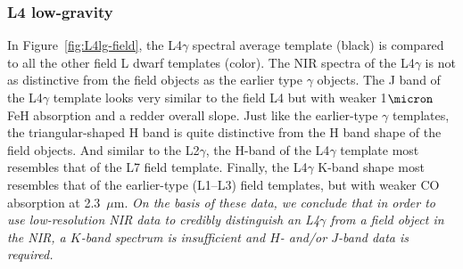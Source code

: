 \documentclass[12pt,preprint]{aastex}
\begin{document}
\subsubsection{L4 low-gravity}
In Figure~\ref{fig:L4lg-field}, the L4$\gamma$ spectral average template (black) is compared to all the other field L dwarf templates (color). 
The NIR spectra of the L4$\gamma$ is not as distinctive from the field objects as the earlier type $\gamma$ objects. 
The J band of the L4$\gamma$ template looks very similar to the field L4 but with weaker 1$\micron$ FeH absorption and a redder overall slope. 
Just like the earlier-type $\gamma$ templates, the triangular-shaped H band is quite distinctive from the H band shape of the field objects. And similar to the L2$\gamma$, the H-band of the L4$\gamma$ template most resembles that of the L7 field template.
Finally, the L4$\gamma$ K-band shape most resembles that of the earlier-type (L1--L3) field templates, but with weaker CO absorption at 2.3~$\mu$m.
\emph{On the basis of these data, we conclude that in order to use low-resolution NIR data to credibly distinguish an L4$\gamma$ from a field object in the NIR, a $K$-band spectrum is insufficient and $H$- and/or $J$-band data is required.}





% 
\end{document}
